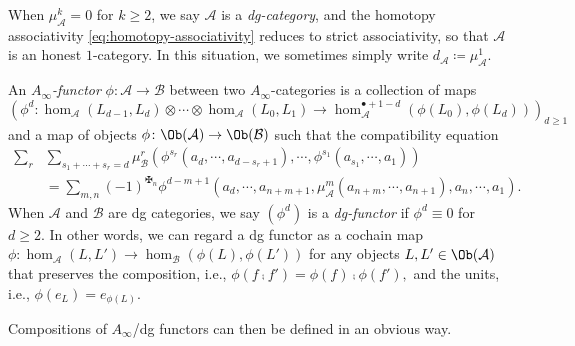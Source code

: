 \begin{dfn}
\begin{itemize}
\end{itemize}
When $\mu_{\mathcal{A}}^k=0$ for $k\geq 2$, we say $\mathcal{A}$ is a \emph{dg-category}, and the homotopy associativity \eqref{eq:homotopy-associativity} reduces to strict associativity, so that $\mathcal{A}$ is an honest $1$-category. In this situation, we sometimes simply write $d_{\mathcal{A}}\coloneqq\mu_{\mathcal{A}}^1$.
\end{dfn}


\begin{defn}
An \emph{$A_{\infty}$-functor}
$\phi:\mathcal{A}\rightarrow\mathcal{B}$
between two $A_{\infty}$-categories is a collection of maps \[
    \left(\phi^d\colon\hom_{\mathcal{A}} (L_{d-1},L_d)\otimes\dotsb\otimes\hom_{\mathcal{A}} (L_0,L_1)\to\hom_{\mathcal{A}}^{\bullet +1-d} (\phi(L_0),\phi(L_d))\right)_{d\geq 1}
\]and a map of objects $\phi\colon\Ob (\mathcal{A})\to\Ob (\mathcal{B})$ such that the compatibility equation
\begin{align*}
    \sum_r&\sum_{s_1+\dotsb+s_r=d}\mu_{\mathcal{B}}^r (\phi^{s_r}(a_d,\dotsb,a_{d-s_r+1}),\dotsb,\phi^{s_1} (a_{s_1},\dotsb, a_1))\\ 
    &=\sum_{m,n}(-1)^{\maltese_n}\phi^{d-m+1}(a_d,\dotsb, a_{n+m+1},\mu_{\mathcal{A}}^m (a_{n+m},\dotsb, a_{n+1}),a_n,\dotsb, a_1).
\end{align*}
When $\mathcal{A}$ and $\mathcal{B}$ are dg categories, we say $(\phi^d)$ is a \emph{dg-functor} if $\phi^d\equiv 0$ for $d\geq 2$. In other words, we can regard a dg functor as a cochain map
$
\phi:
\hom_{\mathcal{A}}(L,L')
\rightarrow
\hom_{\mathcal{B}}(\phi(L),\phi(L'))
$
for any objects $L,L'\in\Ob(\mathcal{A})$
that preserves the composition,
i.e.,
$
\phi(f\comp f')
=
\phi(f)\comp \phi(f'),
$
and the units,
i.e.,
$
\phi(e_L)
=
e_{\phi(L)}.
$

Compositions of $A_{\infty}$/dg functors can then be defined in an obvious way.
\end{defn}


